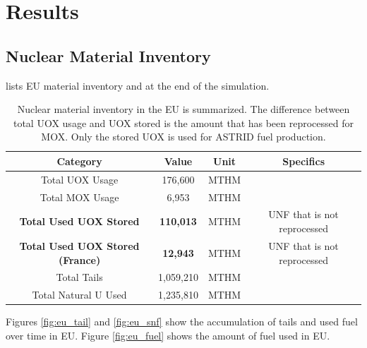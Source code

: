 \section{Results}

\subsection{Nuclear Material Inventory}

 lists \gls{EU} material inventory and
at the end of the simulation.

\begin{table}[h]
	\centering
		\begin{tabular}{cccc}
			\hline
			\textbf{Category } & \textbf{Value} & \textbf{Unit} & \textbf{Specifics}\\ \hline
			Total UOX Usage  & 176,600 & MTHM &  \\ 
			Total MOX Usage  & 6,953 & MTHM & \\ 
			\textbf{Total Used UOX Stored}  & \textbf{110,013} & MTHM & \gls{UNF} that is not reprocessed\\
			\textbf{Total Used UOX Stored (France)} & \textbf{12,943} & MTHM & \gls{UNF} that is not reprocessed \\
			Total Tails  & 1,059,210 & MTHM & \\ 
			Total Natural U Used  & 1,235,810 & MTHM & \\ \hline
		\end{tabular}
		\caption{Nuclear material inventory in the \gls{EU} is summarized. 
				 The difference between total \gls{UOX} usage and \gls{UOX} stored is the amount
				 that has been reprocessed for \gls{MOX}. Only the stored \gls{UOX} is used for \gls{ASTRID} fuel production.}
		\label{tab:sim_result1}
\end {table}
\FloatBarrier


Figures \ref{fig:eu_tail} and \ref{fig:eu_snf} show the 
accumulation of tails and used fuel over time in \gls{EU}.
Figure \ref{fig:eu_fuel} shows the amount of fuel used in \gls{EU}.


